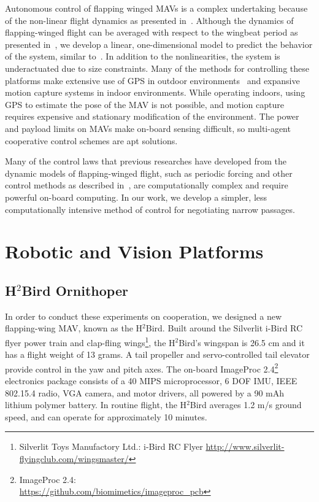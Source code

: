 \documentclass{aamas2013}
\begin{document}
Autonomous control of flapping winged MAVs is a complex undertaking because of
the non-linear flight dynamics as presented
in~\cite{humbert:dipteran2}\cite{cheng:tandrdamping}. Although the dynamics of
flapping-winged flight can be averaged with respect to the wingbeat period as
presented in~\cite{Schenato:flightcontrol}\cite{cheng:tandrdamping}, we develop a
linear, one-dimensional model to predict the behavior of the system, similar
to~\cite{Shigeoka:ornithopter}. In addition to the nonlinearities, the system
is underactuated due to size constraints. Many of the methods for controlling
these platforms make extensive use of GPS in outdoor
environments~\cite{kingston:timeattitude, kanade:3dvision} and expansive
motion capture systems in indoor environments. While operating indoors, using
GPS to estimate the pose of the MAV is not possible, and motion capture
requires expensive and stationary modification of the environment. The power
and payload limits on MAVs make on-board sensing difficult, so multi-agent
cooperative control schemes are apt solutions.

Many of the control laws that previous researches have developed from the
dynamic models of flapping-winged flight, such as periodic forcing and other
control methods as described %
in~\cite{doman:dynamics}\cite{khan:longitudinal_control}\cite{leonard:averaging}, are computationally complex and
require powerful on-board computing. In our work, we develop a simpler, less
computationally intensive method of control for negotiating narrow passages.

\section{Robotic and Vision Platforms}

\subsection{H$^2$Bird Ornithoper}
In order to conduct these experiments on cooperation, we designed a new
flapping-wing MAV, known as the H$^2$Bird. Built around the Silverlit i-Bird 
RC flyer power train and clap-fling 
wings\footnote{Silverlit Toys Manufactory Ltd.: i-Bird RC Flyer
\href{http://www.silverlit-flyingclub.com/wingsmaster/}
     {http://www.silverlit-flyingclub.com/wingsmaster/}}, 
the H$^2$Bird's wingspan is 26.5 cm and it has a flight weight of 13 grams. A 
tail propeller and servo-controlled tail elevator provide control in the yaw 
and pitch axes. The on-board ImageProc 2.4\footnote{ImageProc 2.4: \\
\href{https://github.com/biomimetics/imageproc\_pcb}
     {https://github.com/biomimetics/imageproc\_pcb}} 
electronics package consists of a 40 MIPS microprocessor, 6 DOF IMU, 
IEEE 802.15.4 radio, VGA camera, and motor drivers, all powered by a 90 mAh 
lithium polymer battery. In routine flight, the H$^2$Bird averages 1.2 m/s 
ground speed, and can operate for approximately 10 minutes.
\end{document}
